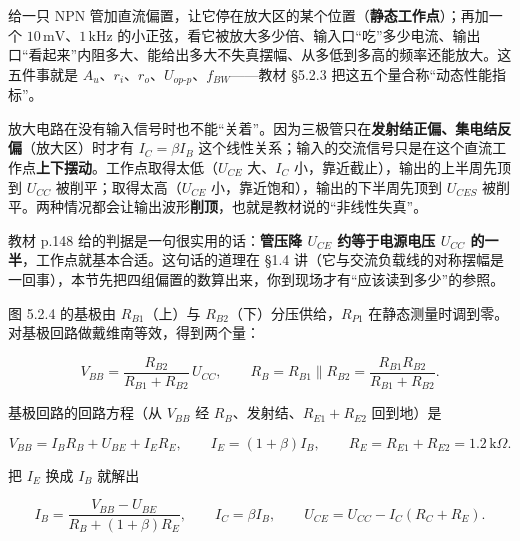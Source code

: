 \documentclass[11pt]{ctexart}
\let\orighdr\hdr
\renewcommand{\hdr}[2]{\needspace{12\baselineskip}\orighdr{#1}{#2}}
\let\origsubhdr\subhdr
\renewcommand{\subhdr}[1]{\needspace{3\baselineskip}\origsubhdr{#1}}
\begin{document}
给一只 NPN 管加直流偏置，让它停在放大区的某个位置（\textbf{静态工作点}）；再加一个 $10\,\mathrm{mV}$、$1\,\mathrm{kHz}$ 的小正弦，看它被放大多少倍、输入口“吃”多少电流、输出口“看起来”内阻多大、能给出多大不失真摆幅、从多低到多高的频率还能放大。这五件事就是 $A_u$、$r_i$、$r_o$、$U_{op\text{-}p}$、$f_{BW}$——教材 §5.2.3 把这五个量合称“动态性能指标”。



放大电路在没有输入信号时也不能“关着”。因为三极管只在\textbf{发射结正偏、集电结反偏}（放大区）时才有 $I_C=\beta I_B$ 这个线性关系；输入的交流信号只是在这个直流工作点\textbf{上下摆动}。工作点取得太低（$U_{CE}$ 大、$I_C$ 小，靠近截止），输出的上半周先顶到 $U_{CC}$ 被削平；取得太高（$U_{CE}$ 小，靠近饱和），输出的下半周先顶到 $U_{CES}$ 被削平。两种情况都会让输出波形\textbf{削顶}，也就是教材说的“非线性失真”。

教材 p.148 给的判据是一句很实用的话：\textbf{管压降 $U_{CE}$ 约等于电源电压 $U_{CC}$ 的一半}，工作点就基本合适。这句话的道理在 §1.4 讲（它与交流负载线的对称摆幅是一回事），本节先把四组偏置的数算出来，你到现场才有“应该读到多少”的参照。


图 5.2.4 的基极由 $R_{B1}$（上）与 $R_{B2}$（下）分压供给，$R_{P1}$ 在静态测量时调到零。对基极回路做戴维南等效，得到两个量：

\[
V_{BB}=\frac{R_{B2}}{R_{B1}+R_{B2}}\,U_{CC},
\qquad
R_B=R_{B1}\parallel R_{B2}=\frac{R_{B1}R_{B2}}{R_{B1}+R_{B2}} .
\]


基极回路的回路方程（从 $V_{BB}$ 经 $R_B$、发射结、$R_{E1}+R_{E2}$ 回到地）是

\[
V_{BB}=I_BR_B+U_{BE}+I_ER_E,\qquad I_E=(1+\beta)I_B,\qquad R_E=R_{E1}+R_{E2}=1.2\,\mathrm{k}\Omega .
\]

把 $I_E$ 换成 $I_B$ 就解出

\[
I_B=\frac{V_{BB}-U_{BE}}{R_B+(1+\beta)R_E},
\qquad
I_C=\beta I_B,
\qquad
U_{CE}=U_{CC}-I_C(R_C+R_E).
\]

\end{document}
